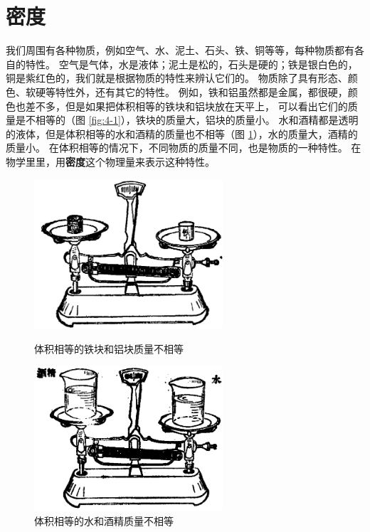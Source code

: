 \section{密度}\label{sec:4-1}

我们周围有各种物质，例如空气、水、泥土、石头、铁、铜等等，每种物质都有各自的特性。
空气是气体，水是液体；泥土是松的，石头是硬的；铁是银白色的，铜是紫红色的，我们就是根据物质的特性来辨认它们的。
物质除了具有形态、颜色、软硬等特性外，还有其它的特性。
例如，铁和铝虽然都是金属，都很硬，颜色也差不多，但是如果把体积相等的铁块和铝块放在天平上，
可以看出它们的质量是不相等的（图 \ref{fig:4-1}），铁块的质量大，铝块的质量小。
水和酒精都是透明的液体，但是体积相等的水和酒精的质量也不相等（图 \ref{fig:4-2}），水的质量大，酒精的质量小。
在体积相等的情况下，不同物质的质量不同，也是物质的一种特性。
在物学里里，用\textbf{密度}这个物理量来表示这种特性。


\begin{figure}[htbp]
    \centering
    \begin{minipage}{7cm}
    \centering
    \includegraphics[width=7cm]{../pic/czwl1-ch4-1}
    \caption{体积相等的铁块和铝块质量不相等}\label{fig:4-1}
    \end{minipage}
    \qquad
    \begin{minipage}{7cm}
    \centering
    \includegraphics[width=7cm]{../pic/czwl1-ch4-2}
    \caption{体积相等的水和酒精质量不相等}\label{fig:4-2}
    \end{minipage}
\end{figure}

